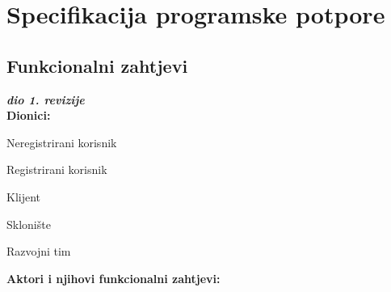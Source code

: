 \chapter{Specifikacija programske potpore}
		
	\section{Funkcionalni zahtjevi}
			
			\textbf{\textit{dio 1. revizije}}\\
			
			\noindent \textbf{Dionici:}
			
			\begin{packed_enum}
				
				\item Neregistrirani korisnik
				\item Registrirani korisnik
				\begin{packed_item}
					\item[a)] Klijent
					\item[b)] Sklonište
				\end{packed_item}
				\item Razvojni tim
				
			\end{packed_enum}
			
			\noindent \textbf{Aktori i njihovi funkcionalni zahtjevi:}
			
